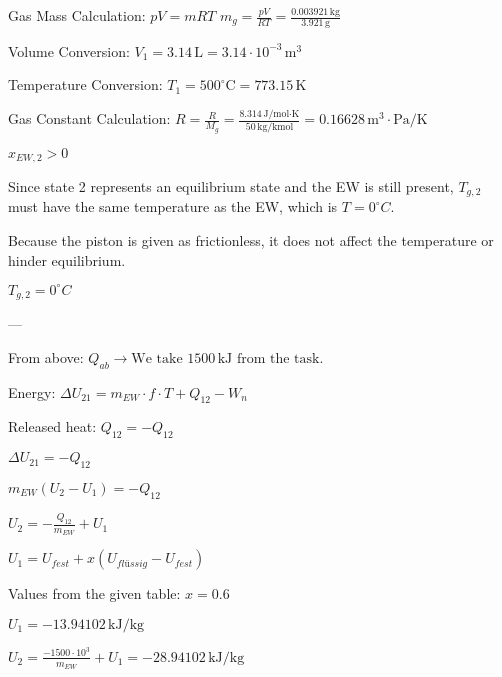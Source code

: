 Gas Mass Calculation:  
\( pV = mRT \)  
\( m_g = \frac{pV}{RT} = \frac{0.003921 \, \text{kg}}{3.921 \, \text{g}} \)  

Volume Conversion:  
\( V_1 = 3.14 \, \text{L} = 3.14 \cdot 10^{-3} \, \text{m}^3 \)  

Temperature Conversion:  
\( T_1 = 500^\circ \text{C} = 773.15 \, \text{K} \)  

Gas Constant Calculation:  
\( R = \frac{R}{M_g} = \frac{8.314 \, \text{J/mol·K}}{50 \, \text{kg/kmol}} = 0.16628 \, \text{m}^3 \cdot \text{Pa}/\text{K} \)

\( x_{EW,2} > 0 \)  

Since state 2 represents an equilibrium state and the EW is still present, \( T_{g,2} \) must have the same temperature as the EW, which is \( T = 0^\circ C \).  

Because the piston is given as frictionless, it does not affect the temperature or hinder equilibrium.  

\( T_{g,2} = 0^\circ C \)  

---

From above:  
\( Q_{ab} \rightarrow \text{We take } 1500 \, \text{kJ} \text{ from the task.} \)  

Energy:  
\( \Delta U_{21} = m_{EW} \cdot f \cdot T + Q_{12} - W_n \)  

Released heat:  
\( Q_{12} = -Q_{12} \)  

\( \Delta U_{21} = -Q_{12} \)  

\( m_{EW} (U_2 - U_1) = -Q_{12} \)  

\( U_2 = -\frac{Q_{12}}{m_{EW}} + U_1 \)  

\( U_1 = U_{fest} + x (U_{flüssig} - U_{fest}) \)  

Values from the given table:  
\( x = 0.6 \)  

\( U_1 = -13.94102 \, \text{kJ/kg} \)  

\( U_2 = \frac{-1500 \cdot 10^3}{m_{EW}} + U_1 = -28.94102 \, \text{kJ/kg} \)